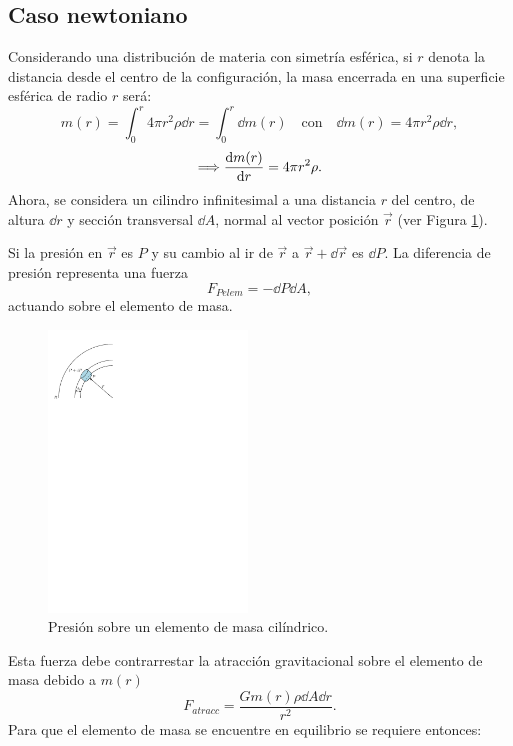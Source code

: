 \subsection{Caso newtoniano}

\noindent Considerando una distribución de materia con simetría esférica, si $r$ denota la distancia desde el centro de la configuración, la masa encerrada en una superficie esférica de radio $r$ será:  
\begin{equation}
    m ( r ) = \int _ { 0 } ^ { r } 4 \pi r ^ { 2 } \rho \dd{r} = \int_{0}^{r} \dd{m(r)} \quad\text{con}\quad \dd{m(r)}=4\pi r^2\rho \dd{r},
    \label{mN}
\end{equation}
\begin{equation}
    \Longrightarrow\dv{m(r)}{r} =4\pi r^2 \rho.
    \label{dmnewton}
\end{equation}
Ahora, se considera un cilindro infinitesimal a una distancia $r$ del centro, de altura $\dd{r}$ y sección transversal $\dd{A}$, normal al vector posición $\vec{r}$ (ver Figura \ref{stellnew}).  

Si la presión en $\vec{r}$ es $P$ y su cambio al ir de $\vec{r}$ a $\vec{r}+\dd{\vec{r}}$ es $\dd{P}$. La diferencia de presión representa una fuerza 
\begin{equation*}
    F_{Pelem}=-\dd{P}\dd{A},
\end{equation*}
actuando sobre el elemento de masa.

\begin{figure}[H]
    \centering
    \includegraphics[width=150pt]{figures/stellarnewton.pdf}
    \caption[Presión sobre un elemento de masa cilíndrico]{Presión sobre un elemento de masa cilíndrico.}
    \label{stellnew}
\end{figure}
 Esta fuerza debe contrarrestar la atracción gravitacional sobre el elemento de masa debido a $m(r)$
\begin{equation*}
    F_{atracc}=\frac{G m(r)\rho \dd{A} \dd{r}}{r^2}.
\end{equation*}
Para que el elemento de masa se encuentre en equilibrio se requiere entonces:

